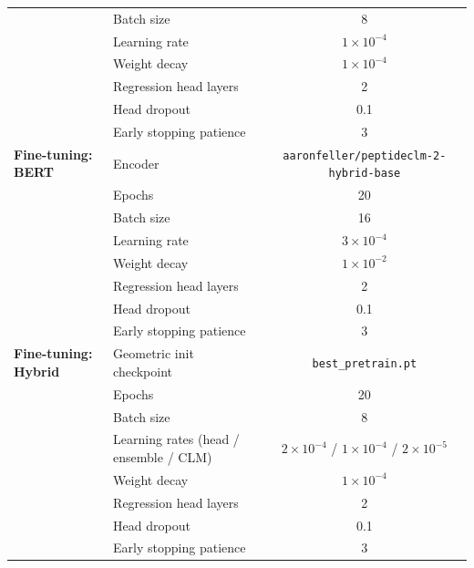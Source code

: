 \documentclass{article}
\begin{document}
\begin{table}[ht]
{\begin{tabular}{llc}
    & Batch size & 8 \\
    & Learning rate & $1 \times 10^{-4}$ \\
    & Weight decay & $1 \times 10^{-4}$ \\
    & Regression head layers & 2 \\
    & Head dropout & 0.1 \\
    & Early stopping patience & 3 \\
    \midrule
    \textbf{Fine-tuning: BERT} & Encoder & \texttt{aaronfeller/peptideclm-2-hybrid-base} \\
    & Epochs & 20 \\
    & Batch size & 16 \\
    & Learning rate & $3 \times 10^{-4}$ \\
    & Weight decay & $1 \times 10^{-2}$ \\
    & Regression head layers & 2 \\
    & Head dropout & 0.1 \\
    & Early stopping patience & 3 \\
    \midrule
    \textbf{Fine-tuning: Hybrid} & Geometric init checkpoint & \texttt{best\_pretrain.pt} \\
    & Epochs & 20 \\
    & Batch size & 8 \\
    & Learning rates (head / ensemble / CLM) & $2 \times 10^{-4}$ / $1 \times 10^{-4}$ / $2 \times 10^{-5}$ \\
    & Weight decay & $1 \times 10^{-4}$ \\
    & Regression head layers & 2 \\
    & Head dropout & 0.1 \\
    & Early stopping patience & 3 \\
    \bottomrule
  \end{tabular}
  }
\end{table}
\end{document}
